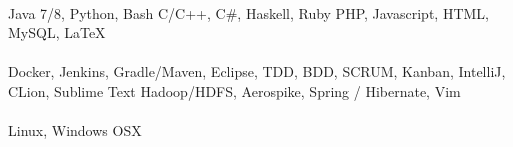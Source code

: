         \underline {}\\
         {Java 7/8, Python, Bash}
         {C/C++, C\#, Haskell, Ruby }
         {PHP, Javascript, HTML, MySQL, LaTeX} 
        \\
        \underline {}\\
         {Docker, Jenkins, Gradle/Maven, Eclipse, TDD, BDD, SCRUM, Kanban, IntelliJ, CLion, Sublime Text}
         {Hadoop/HDFS, Aerospike, Spring / Hibernate, Vim} 
        \\
        \underline {}\\
         {Linux, Windows}
         {OSX}
\pagebreak
